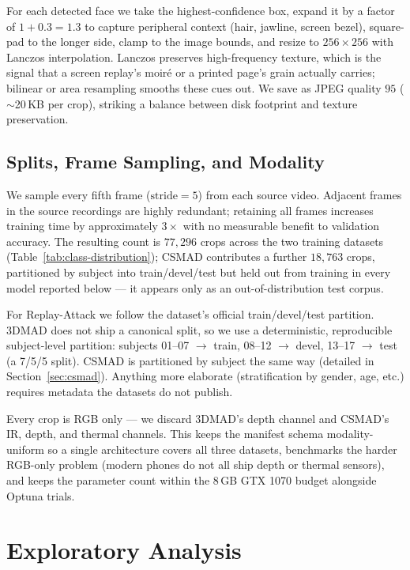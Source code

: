 \documentclass[anonymous, manuscript, screen, review]{acmart}
\begin{document}
For each detected face we take the highest-confidence box, expand it
by a factor of $1{+}0.3 = 1.3$ to capture peripheral context (hair,
jawline, screen bezel), square-pad to the longer side, clamp to the
image bounds, and resize to $256{\times}256$ with Lanczos
interpolation. Lanczos preserves high-frequency texture, which is the
signal that a screen replay's moir\'e or a printed page's grain
actually carries; bilinear or area resampling smooths these cues
out. We save as JPEG quality $95$ ($\sim$20\,KB per crop), striking a
balance between disk footprint and texture preservation.

\subsection{Splits, Frame Sampling, and Modality}

We sample every fifth frame ($\text{stride}=5$) from each source video.
Adjacent frames in the source recordings are highly redundant; retaining
all frames increases training time by approximately $3{\times}$ with no
measurable benefit to validation accuracy. The resulting count is
$77{,}296$ crops across the two training datasets
(Table~\ref{tab:class-distribution}); CSMAD contributes a further
$18{,}763$ crops, partitioned by subject into train/devel/test but
held out from training in every model reported below --- it appears
only as an out-of-distribution test corpus.

For Replay-Attack we follow the dataset's official train/devel/test
partition. 3DMAD does not ship a canonical split, so we use a
deterministic, reproducible subject-level partition: subjects 01--07
$\rightarrow$ train, 08--12 $\rightarrow$ devel, 13--17
$\rightarrow$ test (a 7/5/5 split). CSMAD is partitioned by subject the
same way (detailed in Section~\ref{sec:csmad}). Anything more elaborate
(stratification by gender, age, etc.) requires metadata the datasets
do not publish.

Every crop is RGB only --- we discard 3DMAD's depth channel and CSMAD's
IR, depth, and thermal channels. This keeps the manifest schema
modality-uniform so a single architecture covers all three datasets,
benchmarks the harder RGB-only problem (modern phones do not all ship
depth or thermal sensors), and keeps the parameter count within the
8\,GB GTX 1070 budget alongside Optuna trials.

\section{Exploratory Analysis}
\label{sec:eda}
\end{document}
